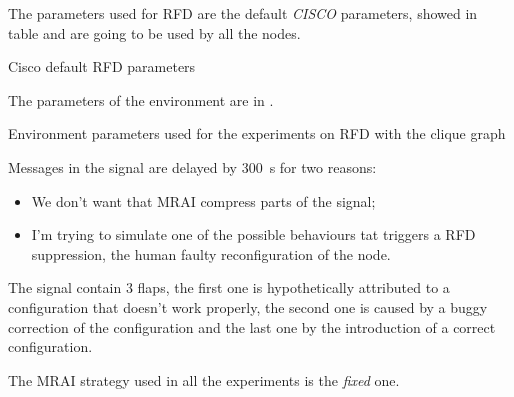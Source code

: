 The parameters used for \ac{RFD} are the default \textit{CISCO} parameters,
showed in table  and are going to be used by
all the nodes.

\begin{table}[h]
	
	\caption{Cisco default \ac{RFD} parameters}
	\label{tbl:cisco_rfd}
\end{table}

The parameters of the environment are in .

\begin{table}[h]
	
	\caption{Environment parameters used for the experiments on \ac{RFD}
		with the clique graph}
	\label{tbl:clique_rfd_params}
\end{table}

Messages in the signal are delayed by \SI{300}{\second} for two reasons:
\begin{itemize}
    \item We don't want that \ac{MRAI} compress parts of the signal;
	\item I'm trying to simulate one of the possible behaviours tat triggers a
		\ac{RFD} suppression, the human faulty reconfiguration of the node.
\end{itemize}

The signal contain \num{3} flaps, the first one is hypothetically attributed
to a configuration that doesn't work properly, the second one is caused by a
buggy correction of the configuration and the last one by the introduction of a
correct configuration.

The \ac{MRAI} strategy used in all the experiments is the \textit{fixed} one.

